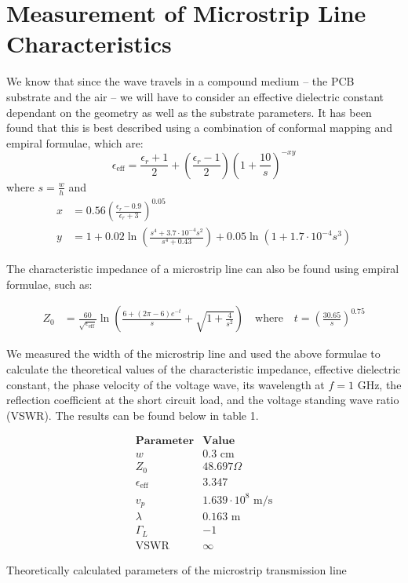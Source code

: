 \documentclass[10pt]{article}
\begin{document}
\section{Measurement of Microstrip Line Characteristics}
\vspace{-0.3cm}
We know that since the wave travels in a compound medium -- the PCB substrate and the air -- we will have 
to consider an effective dielectric constant dependant on the geometry as well as the substrate parameters. It has been
found that this is best described using a combination of conformal mapping and empiral formulae, which are:
\[
    \epsilon_{\text{eff}} = \frac{\epsilon_r+1}{2}+\left(\frac{\epsilon_r-1}{2}\right)\left(1+\frac{10}{s}\right)^{-xy}
\]
where $s = \frac{w}{h}$ and
\begin{align*}
    x &= 0.56\left(\frac{\epsilon_r-0.9}{\epsilon_r+3}\right)^{0.05}\\
    y &= 1 + 0.02\ln{\left(\frac{s^4+3.7\cdot10^{-4}s^2}{s^4 + 0.43}\right)} + 0.05\ln{\left(1 + 1.7\cdot10^{-4}s^3\right)}
\end{align*}

The characteristic impedance of a microstrip line can also be found using empiral formulae, such as:

\begin{align*}
    Z_0 &= \frac{60}{\sqrt{\epsilon_{\text{eff}}}}\ln{\left(\frac{6 + (2\pi - 6)e^{-t}}{s} + \sqrt{1 + \frac{4}{s^2}}\right)} \quad \text{where} \quad t = \left(\frac{30.65}{s}\right)^{0.75}
\end{align*}

We measured the width of the microstrip line and used the above formulae to calculate the theoretical values of the
characteristic impedance, effective dielectric constant, the phase velocity of the voltage wave, its wavelength at $f = 1 \text{ GHz}$, 
the reflection coefficient at the short circuit load, and the voltage standing wave ratio (VSWR). The results can be found below in table 1.

\begin{table}[h]
  \[
      \begin{array}{c|c}
          \textbf{Parameter} & \textbf{Value} \\ \hline
          w & 0.3 \text{ cm}\\
          Z_0 & 48.697\Omega\\
          \epsilon_\text{eff} & 3.347\\
          v_p & 1.639\cdot10^8\text{ m}/\text{s}\\
          \lambda & 0.163 \text{ m}\\
          \Gamma_L & -1\\
          \text{VSWR} & \infty
      \end{array}
  \]
  \caption{Theoretically calculated parameters of the microstrip transmission line\vspace{-0.2cm}}
\end{table}
\end{document}
